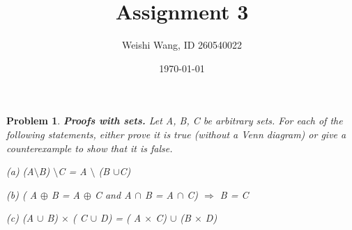 \documentclass{article}
\newtheorem{problem}{Problem}
\theoremstyle{definition}
\begin{document}
 \title{Assignment 3} 

\author{Weishi Wang, ID 260540022} 

\date{\today}

\maketitle

\begin{problem} 

\textbf{Proofs with sets.} Let A, B, C be arbitrary sets. For each of the following statements, either prove it is true (without a Venn diagram) or give a counterexample to show that it is false.

(a) (A\(\setminus\)B) \(\setminus\)C = A \(\setminus\) (B \(\cup\)C)

(b) ( A \(\oplus\) B = A \(\oplus\) C and A \(\cap\) B = A \(\cap\) C) \(\Rightarrow\) B = C

(c) (A \(\cup\) B) \(\times\) ( C \(\cup\) D) = ( A \(\times\) C) \(\cup\) (B \(\times\) D)\\\\

\end{problem}
\end{document}

